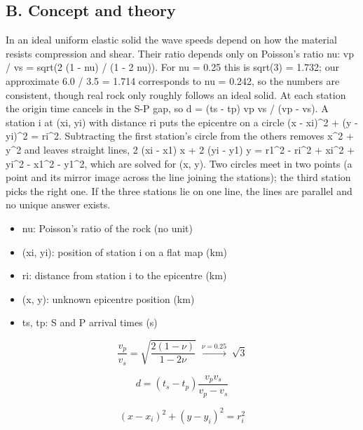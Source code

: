 \documentclass[11pt,a4paper]{article}
\begin{document}
\subsection*{B. Concept and theory}
In an ideal uniform elastic solid the wave speeds depend on how the material resists compression and shear. Their ratio depends only on Poisson's ratio nu: vp / vs = sqrt(2 (1 - nu) / (1 - 2 nu)). For nu = 0.25 this is sqrt(3) = 1.732; our approximate 6.0 / 3.5 = 1.714 corresponds to nu = 0.242, so the numbers are consistent, though real rock only roughly follows an ideal solid. At each station the origin time cancels in the S-P gap, so d = (ts - tp) vp vs / (vp - vs). A station i at (xi, yi) with distance ri puts the epicentre on a circle (x - xi)\textasciicircum{}2 + (y - yi)\textasciicircum{}2 = ri\textasciicircum{}2. Subtracting the first station's circle from the others removes x\textasciicircum{}2 + y\textasciicircum{}2 and leaves straight lines, 2 (xi - x1) x + 2 (yi - y1) y = r1\textasciicircum{}2 - ri\textasciicircum{}2 + xi\textasciicircum{}2 + yi\textasciicircum{}2 - x1\textasciicircum{}2 - y1\textasciicircum{}2, which are solved for (x, y). Two circles meet in two points (a point and its mirror image across the line joining the stations); the third station picks the right one. If the three stations lie on one line, the lines are parallel and no unique answer exists.

\begin{itemize}[nosep]
\item nu: Poisson's ratio of the rock (no unit)
\item (xi, yi): position of station i on a flat map (km)
\item ri: distance from station i to the epicentre (km)
\item (x, y): unknown epicentre position (km)
\item ts, tp: S and P arrival times (s)
\end{itemize}

\begin{equation*}
\frac{v_p}{v_s}=\sqrt{\frac{2(1-\nu)}{1-2\nu}}\;\xrightarrow{\nu=0.25}\;\sqrt3
\end{equation*}

\begin{equation*}
d=(t_s-t_p)\frac{v_p v_s}{v_p-v_s}
\end{equation*}

\begin{equation*}
(x-x_i)^2+(y-y_i)^2=r_i^2
\end{equation*}
\end{document}
